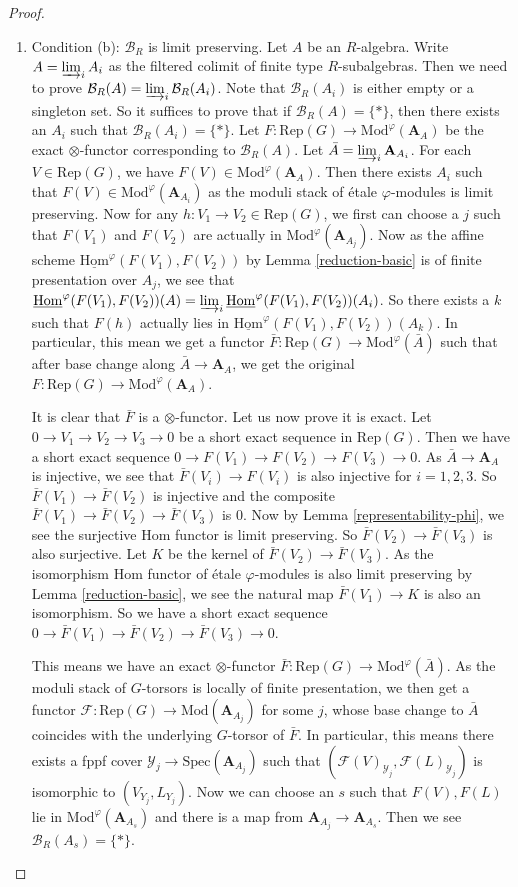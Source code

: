 \documentclass[10pt]{article}
\numberwithin{equation}{section}
\newcommand{\calB}{{\mathcal B}}
\newcommand{\calF}{{\mathcal F}}
\newcommand{\calY}{{\mathcal Y}}
\newcommand{\Hom}{{\mathrm{Hom}}}           %
\newcommand{\Mod}{{\mathrm{Mod}}}           %
\newcommand{\Rep}{{\mathrm{Rep}}}           %
\newcommand{\Spec}{{\mathrm{Spec}}}         %
\newcommand{\bfA}{{\textbf{A}}}
\begin{document}
\begin{proof}
\begin{enumerate}
    \item Condition (b): $\calB_R$ is limit preserving. Let $A$ be an $R$-algebra. Write $A=\varinjlim_i A_i$ as the filtered colimit of finite type $R$-subalgebras. Then we need to prove $\calB_R(A)=\varinjlim_i \calB_R(A_i)$. Note that $\calB_R(A_i)$ is either empty or a singleton set. So it suffices to prove that if $\calB_R(A)=\{*\}$, then there exists an $A_i$ such that $\calB_R(A_i)=\{*\}$.  Let $F:\Rep(G)\to \Mod^{\varphi}(\bfA_A)$ be the exact $\otimes$-functor corresponding to $\calB_R(A)$. Let $\bar A=\varinjlim_i \bfA_{A_i}$. For each $V\in \Rep(G)$, we have $F(V)\in \Mod^{\varphi}(\bfA_A)$. Then there exists $A_i$ such that $F(V)\in \Mod^{\varphi}(\bfA_{A_i})$ as the moduli stack of \'etale $\varphi$-modules is limit preserving. Now for any $h:V_1\to V_2\in \Rep(G)$, we first can choose a $j$ such that $F(V_1)$ and $F(V_2)$ are actually in $\Mod^{\varphi}(\bfA_{A_j})$. Now as the affine scheme $\underline\Hom^{\varphi}(F(V_1),F(V_2))$  by Lemma \ref{reduction-basic} is of finite presentation over $A_j$, we see that $\underline\Hom^{\varphi}(F(V_1),F(V_2))(A)=\varinjlim_i \underline\Hom^{\varphi}(F(V_1),F(V_2))(A_i)$. So there exists a $k$ such that $F(h)$ actually lies in $\underline\Hom^{\varphi}(F(V_1),F(V_2))(A_k)$. In particular, this mean we get a functor $\bar F: \Rep(G)\to \Mod^{\varphi}(\bar A)$ such that after base change along $\bar A\to \bfA_A$, we get the original $F:\Rep(G)\to \Mod^{\varphi}(\bfA_A)$. 

    It is clear that $\bar F$ is a $\otimes$-functor. Let us now prove it is exact. Let $0\to V_1\to V_2\to V_3\to 0$ be a short exact sequence in $\Rep(G)$. Then we have a short exact sequence $0\to F(V_1)\to F(V_2)\to F(V_3)\to 0$. As $\bar A\to \bfA_A$ is injective, we see that $\bar F(V_i)\to F(V_i)$ is also injective for $i=1,2,3$. So $\bar F(V_1)\to \bar F(V_2)$ is injective and the composite $\bar F(V_1)\to \bar F(V_2)\to \bar F(V_3)$ is $0$. Now by Lemma \ref{representability-phi}, we see the surjective Hom functor is limit preserving. So $\bar F(V_2)\to \bar F(V_3)$ is also surjective. Let $K$ be the kernel of $\bar F(V_2)\to \bar F(V_3)$. As the isomorphism Hom functor of \'etale $\varphi$-modules is also limit preserving by Lemma \ref{reduction-basic}, we see the natural map $\bar F(V_1)\to K$ is also an isomorphism. So we have a short exact sequence $0\to \bar F(V_1)\to \bar F(V_2)\to \bar F(V_3)\to 0$. 
    
    
    This means we have an exact $\otimes$-functor $\bar F: \Rep(G)\to \Mod^{\varphi}(\bar A)$. As the moduli stack of $G$-torsors is locally of finite presentation, we then get a functor $\calF: \Rep(G)\to \Mod(\bfA_{A_j})$ for some $j$, whose base change to $\bar A$ coincides with the underlying $G$-torsor of $\bar F$. In particular, this means there exists a fppf cover $\calY_j\to \Spec(\bfA_{A_j})$ such that $(\calF(V)_{\calY_j},\calF(L)_{\calY_j})$
    is isomorphic to $(V_{Y_j},L_{Y_j})$. Now we can choose an $s$ such that $F(V),F(L)$ lie in $\Mod^{\varphi}(\bfA_{A_s})$ and there is a map from $\bfA_{A_j}\to \bfA_{A_s}$. Then we see $\calB_R(A_s)=\{*\}$.


\end{enumerate}
\end{proof}
\end{document}
